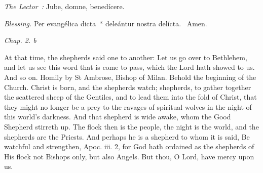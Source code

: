 {{    \emph{The Lector~:} Jube, domne, benedícere.

    \emph{Blessing.} Per evangélica dicta~* deleántur nostra delícta. \Rbar{}~Amen.
  }

  \bigskip{}
  {


  }

  {
    \hspace{10ex}{Lesson VI.}\hfill\emph{Chap. 2. b}\hspace{10ex}

    \begin{parcolumns}[rulebetween,colwidths={1=.51\linewidth}]{2}
    {At that time, the shepherds said one to another: Let us go over to Bethlehem, and let us see this word that is come to pass, which the Lord hath showed to us. And so on.
Homily by St Ambrose, Bishop of Milan.
Behold the beginning of the Church. Christ is born, and the shepherds watch; shepherds, to gather together the scattered sheep of the Gentiles, and to lead them into the fold of Christ, that they might no longer be a prey to the ravages of spiritual wolves in the night of this world's darkness. And that shepherd is wide awake, whom the Good Shepherd stirreth up. The flock then is the people, the night is the world, and the shepherds are the Priests. And perhaps he is a shepherd to whom it is said, Be watchful and strengthen, Apoc. iii. 2, for God hath ordained as the shepherds of His flock not Bishops only, but also Angels.
      But thou, O Lord, have mercy upon us.}
    \end{parcolumns}

}}
